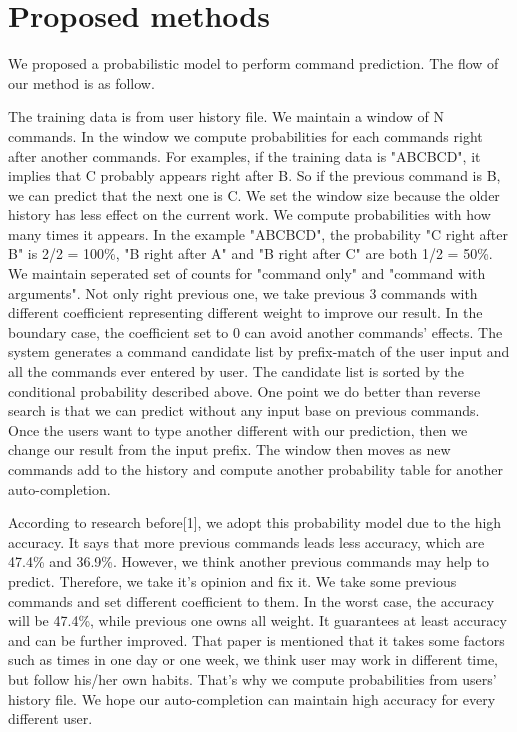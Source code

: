 \documentclass[11pt,a4paper]{article}
\begin{document}
\section*{Proposed methods}
We proposed a probabilistic model to perform command prediction.
The flow of our method is as follow.
\par
The training data is from user history file. 
We maintain a window of N commands. 
In the window we compute probabilities for each commands right after another commands. 
For examples, if the training data is "ABCBCD", it implies that C probably appears right after B.
So if the previous command is B, we can predict that the next one is C.
We set the window size because the older history has less effect on the current work. 
We compute probabilities with how many times it appears.
In the example "ABCBCD", the probability "C right after B" is 2/2 = 100\%, 
"B right after A" and "B right after C" are both 1/2 = 50\%. 
We maintain seperated set of counts for "command only" and "command with arguments".
Not only right previous one, we take previous 3 commands with different coefficient representing different weight to improve our result.
In the boundary case, the coefficient set to 0 can avoid another commands' effects. 
The system generates a command candidate list by prefix-match of the user input and all the commands ever entered by user.
The candidate list is sorted by the conditional probability described above.
One point we do better than reverse search is that we can predict without any input base on previous commands. 
Once the users want to type another different with our prediction, then we change our result from the input prefix.
The window then moves as new commands add to the history and compute another probability table for another auto-completion.
\par
According to research before[1], we adopt this probability model due to the high accuracy. 
It says that more previous commands leads less accuracy, which are 47.4\% and 36.9\%. 
However, we think another previous commands may help to predict. 
Therefore, we take it's opinion and fix it. 
We take some previous commands and set different coefficient to them. 
In the worst case, the accuracy will be 47.4\%, while previous one owns all weight. 
It guarantees at least accuracy and can be further improved. 
That paper is mentioned that it takes some factors such as times in one day or one week, 
we think user may work in different time, but follow his/her own habits.
That's why we compute probabilities from users' history file. 
We hope our auto-completion can maintain high accuracy for every different user. 
\end{document}
